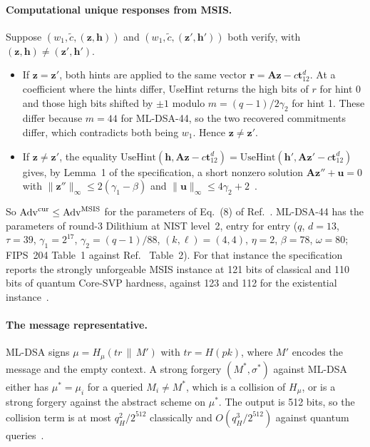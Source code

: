 \documentclass[aps,prx,reprint,superscriptaddress,nofootinbib,floatfix]{revtex4-2}
\theoremstyle{remark}
\newcommand{\Adv}{\mathrm{Adv}}
\newcommand{\Hm}{H_{\mu}}
\begin{document}
\paragraph*{Computational unique responses from MSIS.} Suppose $(w_1,\tilde c,(\mathbf z,\mathbf h))$ and $(w_1,\tilde c,(\mathbf z',\mathbf h'))$ both verify, with $(\mathbf z,\mathbf h)\neq(\mathbf z',\mathbf h')$.
\begin{itemize}
\item If $\mathbf z=\mathbf z'$, both hints are applied to the same vector $\mathbf r=\mathbf A\mathbf z-c\mathbf t_12^d$. At a coefficient where the hints differ, UseHint returns the high bits of $r$ for hint 0 and those high bits shifted by $\pm1$ modulo $m=(q-1)/2\gamma_2$ for hint 1. These differ because $m=44$ for ML-DSA-44, so the two recovered commitments differ, which contradicts both being $w_1$. Hence $\mathbf z\neq\mathbf z'$.
\item If $\mathbf z\neq\mathbf z'$, the equality $\mathrm{UseHint}(\mathbf h,\mathbf A\mathbf z-c\mathbf t_12^d)=\mathrm{UseHint}(\mathbf h',\mathbf A\mathbf z'-c\mathbf t_12^d)$ gives, by Lemma~1 of the specification, a short nonzero solution $\mathbf A\mathbf z''+\mathbf u=0$ with $\|\mathbf z''\|_\infty\le2(\gamma_1-\beta)$ and $\|\mathbf u\|_\infty\le4\gamma_2+2$~\cite[Sec.~6.2.2]{dilithium}.
\end{itemize}
So $\Adv^{\rm cur}\le\Adv^{\rm MSIS}$ for the parameters of Eq.~(8) of Ref.~\cite{dilithium}. ML-DSA-44 has the parameters of round-3 Dilithium at NIST level~2, entry for entry ($q$, $d=13$, $\tau=39$, $\gamma_1=2^{17}$, $\gamma_2=(q-1)/88$, $(k,\ell)=(4,4)$, $\eta=2$, $\beta=78$, $\omega=80$; FIPS~204 Table~1 against Ref.~\cite{dilithium} Table~2). For that instance the specification reports the strongly unforgeable MSIS instance at 121 bits of classical and 110 bits of quantum Core-SVP hardness, against 123 and 112 for the existential instance~\cite[Table~1]{dilithium}.

\paragraph*{The message representative.} ML-DSA signs $\mu=\Hm(\mathit{tr}\,\|\,M')$ with $\mathit{tr}=H(\mathit{pk})$, where $M'$ encodes the message and the empty context. A strong forgery $(M^\ast,\sigma^\ast)$ against ML-DSA either has $\mu^\ast=\mu_i$ for a queried $M_i\neq M^\ast$, which is a collision of $\Hm$, or is a strong forgery against the abstract scheme on $\mu^\ast$. The output is 512 bits, so the collision term is at most $q_H^2/2^{512}$ classically and $O(q_H^3/2^{512})$ against quantum queries~\cite{zhandry-coll}.
\end{document}
